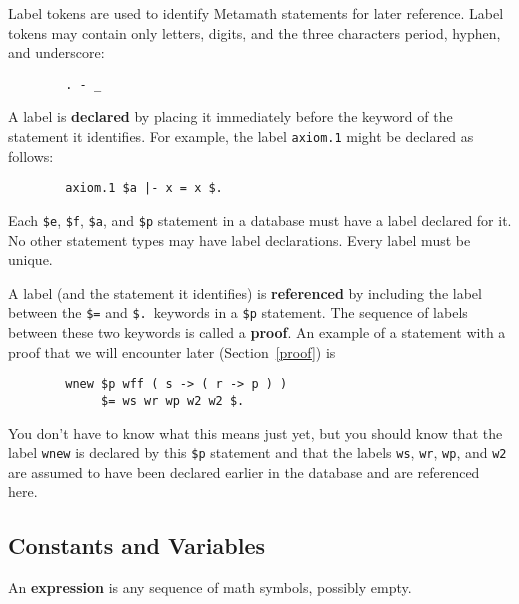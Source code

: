 Label tokens are used to identify Metamath statements for
later reference. Label tokens may contain only letters, digits, and the three
characters period, hyphen, and underscore:\begin{verbatim}
        . - _
\end{verbatim}

A label is {\bf declared} by placing it immediately
before the keyword of the statement it identifies.  For example, the label
\texttt{axiom.1} might be declared as follows:
\begin{verbatim}
        axiom.1 $a |- x = x $.
\end{verbatim}

Each \texttt{\$e},
\texttt{\$f},
\texttt{\$a}, and
\texttt{\$p} statement in a database must
have a label declared for it.  No other statement types may have label
declarations.  Every label must be unique.

A label (and the statement it identifies) is {\bf referenced} by including the label between the \texttt{\$=} and \texttt{\$.}\ keywords in a \texttt{\$p}
statement.  The sequence of labels between these two
keywords is called a {\bf proof}.  An example of a statement with
a proof that we will encounter later (Section~\ref{proof}) is
\begin{verbatim}
        wnew $p wff ( s -> ( r -> p ) )
             $= ws wr wp w2 w2 $.
\end{verbatim}

You don't have to know what this means just yet, but you should know that the
label \texttt{wnew} is declared by this \texttt{\$p} statement and that the labels
\texttt{ws}, \texttt{wr}, \texttt{wp}, and \texttt{w2} are assumed to have been declared
earlier in the database and are referenced here.

\subsection{Constants and Variables}

An {\bf expression} is any sequence of math
symbols, possibly empty.


